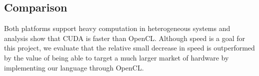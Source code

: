 \subsection{Comparison}
Both platforms support heavy computation in heterogeneous systems and analysis show that CUDA is faster than OpenCL\citep{DBLP:journals/corr/abs-1005-2581}. 
Although speed is a goal for this project, we evaluate that the relative small decrease in speed is outperformed by the value of being able to target a much larger market of hardware by implementing our language through OpenCL.




